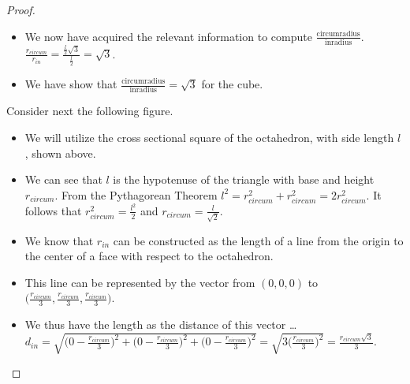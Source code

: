 \documentclass[12pt]{article}
\theoremstyle{plain}
\begin{document}
\begin{proof}
\begin{itemize}
    \subitem It follows that $\displaystyle r_{circum} = \frac{r_{out}\sqrt{3}}{\sqrt{2}} = \frac{\frac{l}{\sqrt{2}}\sqrt{3}}{\sqrt{2}} = \frac{l\sqrt{3}}{2} $.
    \item We now have acquired the relevant information to compute $\displaystyle \frac{\text{circumradius}}{\text{inradius}}$.
    \subitem $\displaystyle \frac{r_{circum}}{r_{in}} = \frac{\frac{l}{2}\sqrt{3}}{\frac{l}{2}} = \sqrt{3}$.
    \item We have show that $\displaystyle \frac{\text{circumradius}}{\text{inradius}}=\sqrt{3}$ for the cube.
  \end{itemize}
  Consider next the following figure. \\
  \begin{center}
  \end{center}
  \begin{itemize}
  \item We will utilize the cross sectional square of the octahedron, with side length $l$, shown above.
  \item We can see that $l$ is the hypotenuse of the triangle with base and height $r_{circum}$.
  \subitem From the Pythagorean Theorem $ l^{2} = r_{circum}^{2} + r_{circum}^{2} = 2r_{circum}^{2} $.
  \subitem It follows that $\displaystyle r_{circum}^{2} = \frac{l^{2}}{2} $ and $\displaystyle r_{circum} = \frac{l}{\sqrt{2}} $.
  \item We know that $r_{in}$ can be constructed as the length of a line from the origin to the center of a face with respect to the octahedron.
  \item This line can be represented by the vector from $ (0,0,0) $ to $\displaystyle \bigl( \frac{r_{circum}}{3}, \frac{r_{circum}}{3}, \frac{r_{circum}}{3} \bigr) $.
  \item We thus have the length as the distance of this vector \dots
  \subitem $ \displaystyle d_{in} = \sqrt{ \bigl( 0-\frac{r_{circum}}{3} \bigr)^{2} + \bigl( 0-\frac{r_{circum}}{3} \bigr)^{2} + \bigl( 0-\frac{r_{circum}}{3} \bigr)^{2}} = \sqrt{3\bigl( \frac{r_{circum}}{3} \bigr)^{2}} = \frac{r_{circum}\sqrt{3}}{3} $.

\end{itemize}
\end{proof}
\end{document}
